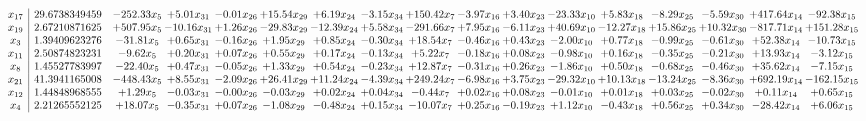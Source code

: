 \documentclass[9pt]{article}
\begin{document}
 \[\begin{array}{c| c c@{\hskip 2pt} c@{\hskip 2pt} c@{\hskip 2pt} c@{\hskip 2pt} c@{\hskip 2pt} c@{\hskip 2pt} c@{\hskip 2pt} c@{\hskip 2pt} c@{\hskip 2pt} c@{\hskip 2pt} c@{\hskip 2pt} c@{\hskip 2pt} c@{\hskip 2pt} c@{\hskip 2pt} c@{\hskip 2pt} }
 x_{17}   &  29.6738349459 & -252.33 x_{5} & +  5.01 x_{31} & -0.01 x_{26} & + 15.54 x_{29} & +  6.19 x_{24} & -3.15 x_{34} & + 150.42 x_{7} & -3.97 x_{16} & +  3.40 x_{23} & -23.33 x_{10} & +  5.83 x_{18} & -8.29 x_{25} & -5.59 x_{30} & + 417.64 x_{14} & -92.38 x_{15}\\
 x_{19}   &  2.67210871625 & + 507.95 x_{5} & -10.16 x_{31} & +  1.26 x_{26} & -29.83 x_{29} & -12.39 x_{24} & +  5.58 x_{34} & -291.66 x_{7} & +  7.95 x_{16} & -6.11 x_{23} & + 40.69 x_{10} & -12.27 x_{18} & + 15.86 x_{25} & + 10.32 x_{30} & -817.71 x_{14} & + 151.28 x_{15}\\
 x_{3}   &  1.39409623276 & -31.81 x_{5} & +  0.65 x_{31} & -0.16 x_{26} & +  1.95 x_{29} & +  0.85 x_{24} & -0.30 x_{34} & + 18.54 x_{7} & -0.46 x_{16} & +  0.43 x_{23} & -2.00 x_{10} & +  0.77 x_{18} & -0.99 x_{25} & -0.61 x_{30} & + 52.38 x_{14} & -10.73 x_{15}\\
 x_{11}   &  2.50874823231 & -9.62 x_{5} & +  0.20 x_{31} & +  0.07 x_{26} & +  0.55 x_{29} & +  0.17 x_{24} & -0.13 x_{34} & +  5.22 x_{7} & -0.18 x_{16} & +  0.08 x_{23} & -0.98 x_{10} & +  0.16 x_{18} & -0.35 x_{25} & -0.21 x_{30} & + 13.93 x_{14} & -3.12 x_{15}\\
 x_{8}   &  1.45527783997 & -22.40 x_{5} & +  0.47 x_{31} & -0.05 x_{26} & +  1.33 x_{29} & +  0.54 x_{24} & -0.23 x_{34} & + 12.87 x_{7} & -0.31 x_{16} & +  0.26 x_{23} & -1.86 x_{10} & +  0.50 x_{18} & -0.68 x_{25} & -0.46 x_{30} & + 35.62 x_{14} & -7.15 x_{15}\\
 x_{21}   &  41.3941165008 & -448.43 x_{5} & +  8.55 x_{31} & -2.09 x_{26} & + 26.41 x_{29} & + 11.24 x_{24} & -4.39 x_{34} & + 249.24 x_{7} & -6.98 x_{16} & +  3.75 x_{23} & -29.32 x_{10} & + 10.13 x_{18} & -13.24 x_{25} & -8.36 x_{30} & + 692.19 x_{14} & -162.15 x_{15}\\
 x_{12}   &  1.44848968555 & +  1.29 x_{5} & -0.03 x_{31} & -0.00 x_{26} & -0.03 x_{29} & +  0.02 x_{24} & +  0.04 x_{34} & -0.44 x_{7} & +  0.02 x_{16} & +  0.08 x_{23} & -0.01 x_{10} & +  0.01 x_{18} & +  0.03 x_{25} & -0.02 x_{30} & +  0.11 x_{14} & +  0.65 x_{15}\\
 x_{4}   &  2.21265552125 & + 18.07 x_{5} & -0.35 x_{31} & +  0.07 x_{26} & -1.08 x_{29} & -0.48 x_{24} & +  0.15 x_{34} & -10.07 x_{7} & +  0.25 x_{16} & -0.19 x_{23} & +  1.12 x_{10} & -0.43 x_{18} & +  0.56 x_{25} & +  0.34 x_{30} & -28.42 x_{14} & +  6.06 x_{15}\\

\end{array}\]
\end{document}
